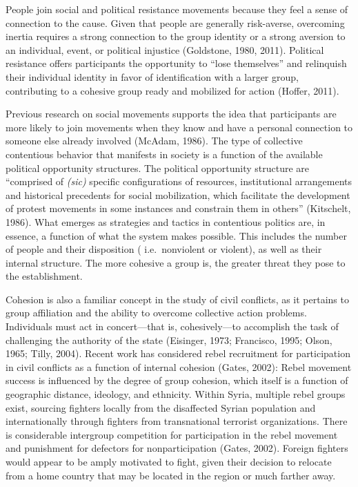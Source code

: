 \documentclass[english,man]{apa6}
\begin{document}
People join social and political resistance movements because they feel a sense
of connection to the cause. Given that people are generally risk-averse, overcoming inertia
requires a strong connection to the group identity or a strong aversion to an
individual, event, or political injustice (Goldstone, 1980, 2011). Political resistance offers participants the
opportunity to \enquote{lose themselves} and relinquish their individual identity in
favor of identification with a larger group, contributing to a cohesive
group ready and mobilized for action (Hoffer, 2011).

Previous research on social movements supports the idea that participants are
more likely to join movements when they know and have a personal connection to
someone else already involved (McAdam, 1986). The type of collective
contentious behavior that manifests in society is a function of the available
political opportunity structures. The political opportunity structure are
\enquote{comprised of \emph{(sic)} specific configurations of resources, institutional
arrangements and historical precedents for social mobilization, which facilitate
the development of protest movements in some instances and constrain them in
others} (Kitschelt, 1986). What emerges as strategies and tactics in
contentious politics are, in essence, a function of what the system makes
possible. This includes the number of people and their disposition (
i.e.~nonviolent or violent), as well as their internal structure. The more cohesive a
group is, the greater threat they pose to the establishment.

Cohesion is also a familiar concept in the study of civil conflicts, as it
pertains to group affiliation and the ability to overcome collective action
problems. Individuals must act in concert---that is, cohesively---to
accomplish the task of challenging the authority of the state (Eisinger, 1973; Francisco, 1995; Olson, 1965; Tilly, 2004).
Recent work has considered rebel recruitment for participation in
civil conflicts as a function of internal cohesion (Gates, 2002):
Rebel movement success is influenced by the degree of group cohesion, which
itself is a function of geographic distance, ideology, and ethnicity.
Within Syria, multiple rebel groups exist, sourcing fighters locally
from the disaffected Syrian population and internationally through
fighters from transnational terrorist organizations. There is considerable
intergroup competition for participation in the rebel movement and
punishment for defectors for nonparticipation (Gates, 2002).
Foreign fighters would appear to be amply motivated to fight, given their
decision to relocate from a home country that may be located in the region
or much farther away.
\end{document}
